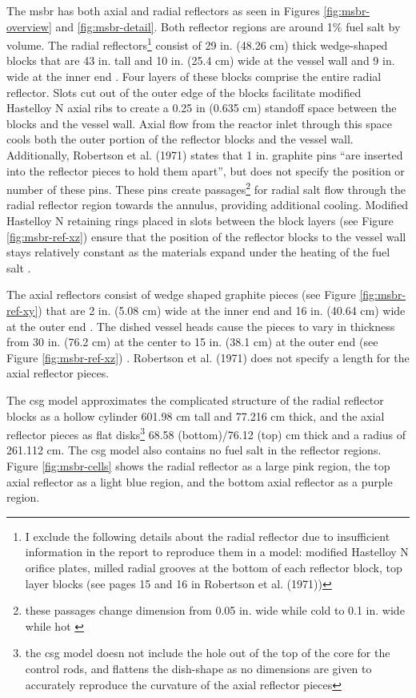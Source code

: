 The \Gls{msbr} has both axial and radial reflectors as seen in Figures
\ref{fig:msbr-overview} and \ref{fig:msbr-detail}. Both reflector regions are around 1\% fuel salt by volume. The radial
reflectors\footnote{I exclude the following details about the radial reflector
due to insufficient information in the report to reproduce them in a model:
modified Hastelloy N orifice plates, milled radial grooves at the bottom of each
reflector block, top layer blocks (see pages 15 and 16 in Robertson et al.
(1971))} consist of 29 in. (48.26 cm) thick wedge-shaped blocks that are 43 in. tall and 10 in. (25.4 cm) wide at the vessel wall and 9 in. wide at the inner end \cite{robertson_conceptual_1971}.
Four layers of these blocks comprise the entire radial reflector. Slots cut out
of the outer edge of the blocks facilitate modified Hastelloy N axial ribs to create a
0.25 in (0.635 cm) standoff space between the blocks and the vessel wall. Axial
flow from the reactor inlet through this space cools both the outer portion of
the reflector blocks and the vessel wall. Additionally, Robertson et al. (1971)
states that 1 in. graphite pins ``are inserted into the reflector pieces to hold
them apart'', but does not specify the position or number of these pins. These
pins create passages\footnote{these passages change dimension from 0.05 in. wide
while cold to 0.1 in. wide while hot \cite{robertson_conceptual_1971}} for
radial salt flow through the radial reflector region towards the annulus,
providing additional cooling. Modified Hastelloy N retaining rings placed in slots
between the block layers (see Figure \ref{fig:msbr-ref-xz}) ensure that the
position of the reflector blocks to the vessel wall stays relatively constant as
the materials expand under the heating of the fuel salt
\cite{robertson_conceptual_1971}.

The axial reflectors consist of wedge shaped graphite pieces (see Figure
\ref{fig:msbr-ref-xy}) that are 2 in. (5.08 cm) wide at the inner end and 16 in.
(40.64 cm) wide at the outer end \cite{robertson_conceptual_1971}. The dished
vessel heads cause the pieces to vary in thickness from 30 in. (76.2 cm) at the
center to 15 in. (38.1 cm) at the outer end (see Figure
\ref{fig:msbr-ref-xz}) \cite{robertson_conceptual_1971}. Robertson et al. (1971)
does not specify a length for the axial reflector pieces. 

The \Gls{csg} model approximates the complicated structure of the radial
reflector blocks as a hollow cylinder 601.98 cm tall and 77.216 cm thick, and
the axial reflector pieces as flat disks\footnote{the \Gls{csg} model doesn not
include the hole out of the top of the core for the control rods, and flattens
the dish-shape as no dimensions are given to accurately reproduce the curvature
of the axial reflector pieces} 68.58 (bottom)/76.12 (top) cm thick and a radius
of 261.112 cm. The \Gls{csg} model also contains no fuel salt in the reflector
regions. Figure \ref{fig:msbr-cells} shows the radial reflector as a large pink
region, the top axial reflector as a light blue region, and the bottom axial
reflector as a purple region.

